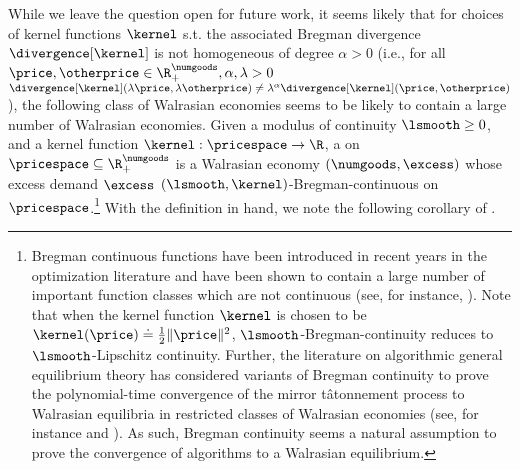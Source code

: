 While we leave the question open for future work, it seems likely that for choices of kernel functions $\kernel$ s.t. the associated Bregman divergence $\divergence[\kernel]$ is not homogeneous of degree $\alpha > 0$ (i.e., for all $\price, \otherprice \in \R^\numgoods_+, \alpha, \lambda > 0$ $\divergence[\kernel](\lambda \price, \lambda\otherprice) \neq \lambda^\alpha \divergence[\kernel](\price, \otherprice)$), the following class of Walrasian economies seems to be likely to contain a large number of Walrasian economies. 
Given a modulus of continuity $\lsmooth \geq 0$, and a kernel function $\kernel: \pricespace \to \R$, a  on $\pricespace \subseteq \R^\numgoods_+$ is a Walrasian economy $(\numgoods, \excess)$ whose excess demand $\excess$ $(\lsmooth, \kernel)$-Bregman-continuous on $\pricespace$.\footnote{Bregman continuous functions have been introduced in recent years in the optimization literature and have been shown to contain a large number of important function classes which are not continuous (see, for instance, \citet{lu2019relative}). Note that when the kernel function $\kernel$ is chosen to be $\kernel(\price) \doteq \frac{1}{2}\|\price\|^2$, $\lsmooth$-Bregman-continuity reduces to $\lsmooth$-Lipschitz continuity. Further, the literature on algorithmic general equilibrium theory has considered variants of Bregman continuity to prove the polynomial-time convergence of the mirror t\^atonnement process to Walrasian equilibria in restricted classes of Walrasian economies (see, for instance \citet{fisher-tatonnement} and \citet{cheung2018dynamics}). As such, Bregman continuity seems a natural assumption to prove the convergence of algorithms to a Walrasian equilibrium. } 
With the definition in hand, we note the following corollary of .

